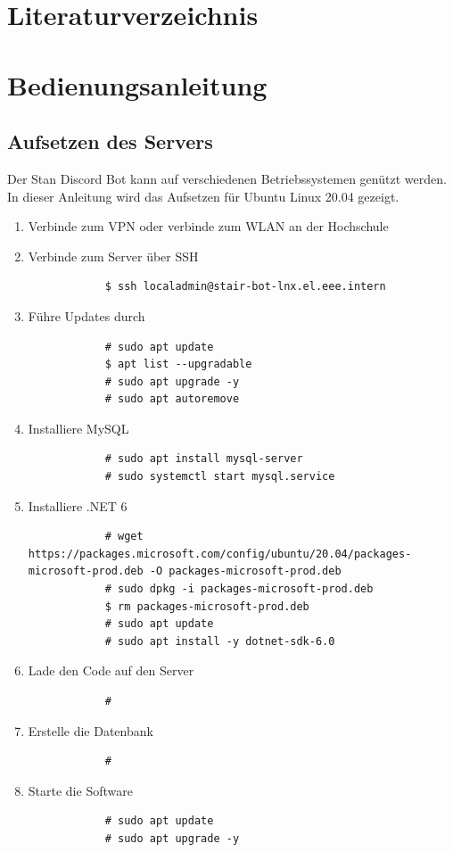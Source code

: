 \documentclass[a4paper, table]{article}
\begin{document}
\section{Literaturverzeichnis}
\printbibliography

\section{Bedienungsanleitung}

\subsection{Aufsetzen des Servers}

Der Stan Discord Bot kann auf verschiedenen Betriebssystemen genützt werden.
In dieser Anleitung wird das Aufsetzen für Ubuntu Linux 20.04 gezeigt.


\begin{enumerate}
    \item Verbinde zum VPN oder verbinde zum WLAN an der Hochschule
    \item Verbinde zum Server über SSH
        \begin{verbatim}
            $ ssh localadmin@stair-bot-lnx.el.eee.intern
        \end{verbatim}
    \item Führe Updates durch
        \begin{verbatim}
            # sudo apt update
            $ apt list --upgradable
            # sudo apt upgrade -y
            # sudo apt autoremove
        \end{verbatim}
    \item Installiere MySQL
        \begin{verbatim}
            # sudo apt install mysql-server
            # sudo systemctl start mysql.service
        \end{verbatim}
    \item Installiere .NET 6
        \begin{verbatim}
            # wget https://packages.microsoft.com/config/ubuntu/20.04/packages-microsoft-prod.deb -O packages-microsoft-prod.deb
            # sudo dpkg -i packages-microsoft-prod.deb
            $ rm packages-microsoft-prod.deb
            # sudo apt update
            # sudo apt install -y dotnet-sdk-6.0
        \end{verbatim}
    \item Lade den Code auf den Server
        \begin{verbatim}
            # 
        \end{verbatim}
    \item Erstelle die Datenbank
        \begin{verbatim}
            # 
        \end{verbatim}
    \item Starte die Software
        \begin{verbatim}
            # sudo apt update
            # sudo apt upgrade -y
        \end{verbatim}
\end{enumerate}
\end{document}
